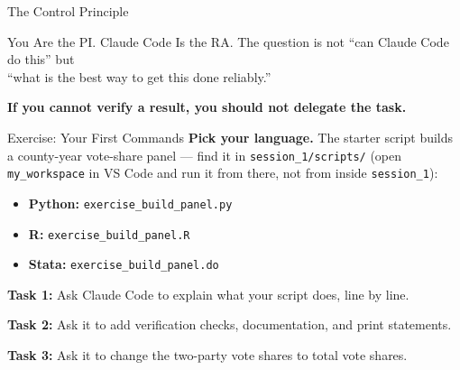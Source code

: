 \documentclass[aspectratio=169, 11pt]{beamer}
\begin{document}

\begin{frame}{The Control Principle}
  \begin{alertblock}{You Are the PI. Claude Code Is the RA.}
    The question is not ``can Claude Code do this'' but\\
    ``what is the best way to get this done reliably.''
  \end{alertblock}

  \vspace{1em}
  \centering
  \textbf{If you cannot verify a result, you should not delegate the task.}

\end{frame}


\begin{frame}[fragile]{Exercise: Your First Commands}
  \textbf{Pick your language.} The starter script builds a county-year vote-share panel --- find it in \texttt{session\_1/scripts/} (open \texttt{my\_workspace} in VS Code and run it from there, not from inside \texttt{session\_1}):

  \vspace{0.2em}
  \begin{itemize}
    \item \textbf{Python:} \texttt{exercise\_build\_panel.py}
    \item \textbf{R:} \texttt{exercise\_build\_panel.R}
    \item \textbf{Stata:} \texttt{exercise\_build\_panel.do}
  \end{itemize}

  \vspace{0.4em}
  \textbf{Task 1:} Ask Claude Code to explain what your script does, line by line.

  \vspace{0.4em}
  \textbf{Task 2:} Ask it to add verification checks, documentation, and print statements.

  \vspace{0.4em}
  \textbf{Task 3:} Ask it to change the two-party vote shares to total vote shares.
\end{frame}
\end{document}
